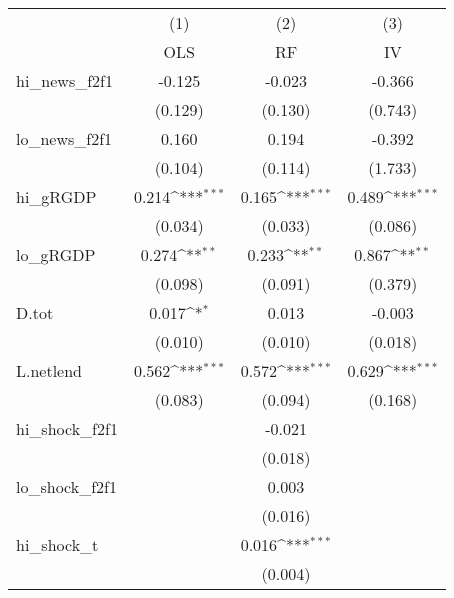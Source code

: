 {
\def\sym#1{\ifmmode^{#1}\else\(^{#1}\)\fi}
\begin{tabular}{l*{3}{c}}
\toprule
            &\multicolumn{1}{c}{(1)}&\multicolumn{1}{c}{(2)}&\multicolumn{1}{c}{(3)}\\
            &\multicolumn{1}{c}{OLS}&\multicolumn{1}{c}{RF}&\multicolumn{1}{c}{IV}\\
\midrule
hi\_news\_f2f1&      -0.125         &      -0.023         &      -0.366         \\
            &     (0.129)         &     (0.130)         &     (0.743)         \\
\addlinespace
lo\_news\_f2f1&       0.160         &       0.194         &      -0.392         \\
            &     (0.104)         &     (0.114)         &     (1.733)         \\
\addlinespace
hi\_gRGDP    &       0.214\sym{***}&       0.165\sym{***}&       0.489\sym{***}\\
            &     (0.034)         &     (0.033)         &     (0.086)         \\
\addlinespace
lo\_gRGDP    &       0.274\sym{**} &       0.233\sym{**} &       0.867\sym{**} \\
            &     (0.098)         &     (0.091)         &     (0.379)         \\
\addlinespace
D.tot       &       0.017\sym{*}  &       0.013         &      -0.003         \\
            &     (0.010)         &     (0.010)         &     (0.018)         \\
\addlinespace
L.netlend   &       0.562\sym{***}&       0.572\sym{***}&       0.629\sym{***}\\
            &     (0.083)         &     (0.094)         &     (0.168)         \\
\addlinespace
hi\_shock\_f2f1&                     &      -0.021         &                     \\
            &                     &     (0.018)         &                     \\
\addlinespace
lo\_shock\_f2f1&                     &       0.003         &                     \\
            &                     &     (0.016)         &                     \\
\addlinespace
hi\_shock\_t  &                     &       0.016\sym{***}&                     \\
            &                     &     (0.004)         &                     \\

\end{tabular}}
